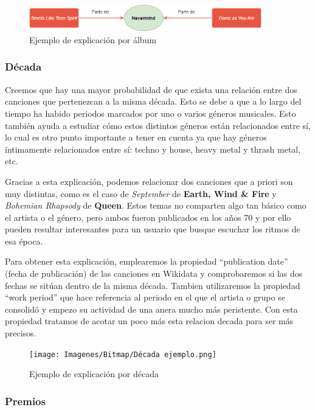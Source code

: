 \begin{figure}[h!]
	\centering
	\includegraphics[width = 0.9\textwidth]{Imagenes/Bitmap/Álbum ejemplo.png}
	\caption{Ejemplo de explicación por álbum}
	\label{fig:sampleImage}
\end{figure}

\subsubsection*{Década}

Creemos que hay una mayor probabilidad de que exista una relación entre dos canciones que pertenezcan a la misma década. Esto se debe a que a lo largo del tiempo ha habido periodos marcados por uno o varios géneros musicales. Esto también ayuda a estudiar cómo estos distintos géneros están relacionados entre sí, lo cual es otro punto importante a tener en cuenta ya que hay géneros íntimamente relacionados entre sí: techno y house, heavy metal y thrash metal, etc.

Gracias a esta explicación, podemos relacionar dos canciones que a priori son muy distintas, como es el caso de \textit{September} de \textbf{Earth, Wind \& Fire} y \textit{Bohemian Rhapsody} de \textbf{Queen}. Estos temas no comparten algo tan básico como el artista o el género, pero ambos fueron publicados en los años 70 y por ello pueden resultar interesantes para un usuario que busque escuchar los ritmos de esa época.

Para obtener esta explicación, emplearemos la propiedad ``publication date'' (fecha de publicación) de las canciones en Wikidata y comprobaremos si las dos fechas se sitúan dentro de la misma década.
Tambien utilizaremos la propiedad ``work period'' que hace referencia al periodo en el que el artista o grupo se consolidó y empezo su actividad de una anera mucho más peristente. Con esta propiedad tratamos de acotar un poco más esta relacion decada para ser más precisos.\\

\begin{figure}[h!]
	\centering
	\texttt{[image: Imagenes/Bitmap/Década ejemplo.png]}
	\caption{Ejemplo de explicación por década}
	\label{fig:sampleImage}
\end{figure}

\subsubsection*{Premios}

